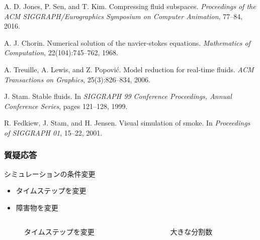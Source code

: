 \documentclass[aspectratio=169,dvipdfmx,hyperref={bookmarks=true}]{beamer}
\begin{document}
\begin{thebibliography}{99}
\beamertemplatetextbibitems
{}
A. D. Jones, P. Sen, and T. Kim. Compressing fluid subspaces. \textit{Proceedings of the ACM SIGGRAPH/Eurographics Symposium on Computer Animation}, 77--84, 2016.

A. J. Chorin. Numerical solution of the navier-stokes equations. \textit{Mathematics of Computation}, 22(104):745--762, 1968.

A. Treuille, A. Lewis, and Z. Popovi\'{c}. Model reduction for real-time fluids. \textit{ACM Transactions on Graphics}, 25(3):826--834, 2006.

J. Stam. Stable fluids. In \textit{SIGGRAPH 99 Conference Proceedings, Annual Conference Series}, pages 121--128, 1999.

R. Fedkiew, J. Stam, and H. Jensen. Visual simulation of smoke. In \textit{Proceedings of SIGGRAPH 01}, 15--22, 2001.


  
 \begin{frame}
 \frametitle{質疑応答}
\begin{block}{シミュレーションの条件変更}
\begin{itemize}
	\item タイムステップを変更
	\item 障害物を変更
\end{itemize}
\end{block}
\begin{columns}
    \begin{column}{0.33\textwidth}
   \begin{figure}
\caption{タイムステップを変更}
   \end{figure}
    \end{column}
    \begin{column}{0.33\textwidth}
       \begin{figure}
\caption{大きな分割数}
   \end{figure}
    \end{column}
 \end{columns}


\end{frame}
\end{thebibliography}
\end{document}
